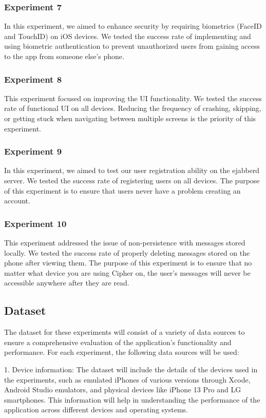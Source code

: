 \documentclass[12pt]{article}
\begin{document}
\subsubsection{Experiment 7}
In this experiment, we aimed to enhance security by requiring biometrics (FaceID and TouchID) on iOS devices. We tested the success rate of implementing and using biometric authentication to prevent unauthorized users from gaining access to the app from someone else's phone.

\subsubsection{Experiment 8}
This experiment focused on improving the UI functionality. We tested the success rate of functional UI on all devices. Reducing the frequency of crashing, skipping, or getting stuck when navigating between multiple screens is the priority of this experiment.
\subsubsection{Experiment 9}
In this experiment, we aimed to test our user registration ability on the ejabberd server. We tested the success rate of registering users on all devices. The purpose of this experiment is to ensure that users never have a problem creating an account.

\subsubsection{Experiment 10}
This experiment addressed the issue of non-persistence with messages stored locally. We tested the success rate of properly deleting messages stored on the phone after viewing them. The purpose of this experiment is to ensure that no matter what device you are using Cipher on, the user’s messages will never be accessible anywhere after they are read.



\subsection{Dataset}\label{sec:dataset}
       The dataset for these experiments will consist of a variety of data sources to ensure a comprehensive evaluation of the application's functionality and performance. For each experiment, the following data sources will be used:

1. Device information: The dataset will include the details of the devices used in the experiments, such as emulated iPhones of various versions through Xcode, Android Studio emulators, and physical devices like iPhone 13 Pro and LG smartphones. This information will help in understanding the performance of the application across different devices and operating systems.
\end{document}
